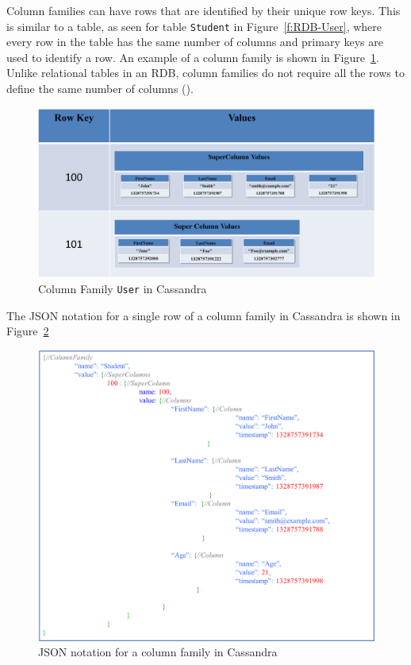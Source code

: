 \begin{description}
Column families can have rows %
that are identified by their unique row keys.  This is similar to a table,   as
seen for table \texttt{Student} in Figure~\ref{f:RDB-User},   where every row in
the table has the same number of columns and primary keys are used to identify a
row.  An example of a column family is shown in Figure~\ref{f:columnfamilyUSER}.
Unlike relational tables in an \ac{RDB},   column families do not require all
the rows to define the same number of columns ().

\begin{figure}[H]
	\centering
	\includegraphics[width=.8\textwidth]{./figure/Example/ColumnFamily-User-DiffColumns.png}
	\caption{Column Family \texttt{User} in Cassandra}\label{f:columnfamilyUSER}
\end{figure}

The JSON notation for a single row of a column family in Cassandra is
shown in Figure~\ref{f:columnfamilyJSON} 

\begin{figure}[H]
	\centering
	\includegraphics[width=.8\textwidth]{./figure/Example/JSON_ColumnFamily_1row.png}
	\caption{JSON notation for a column family in
	Cassandra}\label{f:columnfamilyJSON}
\end{figure}


\end{description}

